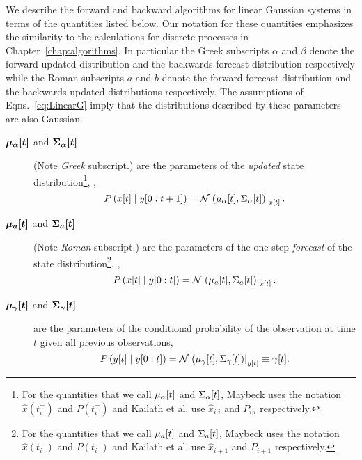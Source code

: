 We describe the forward and backward algorithms for linear Gaussian
systems in terms of the quantities listed below.  Our notation for
these quantities emphasizes the similarity to the calculations for
discrete processes in Chapter~\ref{chap:algorithms}.  In particular
the Greek subscripts $\alpha$ and $\beta$ denote the forward updated
distribution and the backwards forecast distribution respectively while
the Roman subscripts $a$ and $b$ denote the forward forecast
distribution and the backwards updated distributions respectively.
The assumptions of Eqns.~\eqref{eq:LinearG} imply that the
distributions described by these parameters are also Gaussian.
\begin{description}
\item[$\bm{{\mu_\alpha}{[t]}}$ and $\bm{{\Sigma_\alpha}{[t]}}$]
  (Note \emph{Greek} subscript.) are the parameters of the
  \emph{updated} state distribution\footnote{For the quantities that
    we call ${\mu_\alpha}{[t]}$ and ${\Sigma_\alpha}{[t]}$,
    Maybeck\cite{Maybeck82} uses the notation $\hat x(t^+_i)$ and
    $P(t^+_i)$ and Kailath et al.\cite{KSH00} use $\hat x_{i|i}$ and
    $P_{i|i}$ respectively.}, \ie,
  \begin{equation*}
    P\left({x}{[t]}\mid y[0:t+1] \right) =
    {\mathcal{N}}\left.\left({\mu_\alpha}{[t]},{\Sigma_\alpha}{[t]}\right)\right|_{{x}{[t]}}.
  \end{equation*}
\item[$\bm{{\mu_a}{[t]}}$ and $\bm{{\Sigma_a}{[t]}}$] (Note
  \emph{Roman} subscript.) are the parameters of the one step
  \emph{forecast} of the state distribution\footnote{For the
    quantities that we call ${\mu_a}{[t]}$ and ${\Sigma_a}{[t]}$,
    Maybeck\cite{Maybeck82} uses the notation $\hat x(t^-_i)$ and
    $P(t^-_i)$ and Kailath et al.\cite{KSH00} use $\hat x_{i+1}$ and
    $P_{i+1}$ respectively.}, \ie,
  \begin{equation*}
    P \left({x}{[t]}\mid y[0:t] \right) =
    {\mathcal{N}}\left.\left({\mu_a}{[t]},{\Sigma_a}{[t]}\right)\right|_{{x}{[t]}}.
  \end{equation*}
\item[$\bm{{\mu_\gamma}{[t]}}$ and $\bm{{\Sigma_\gamma}{[t]}}$] are
  the parameters of the conditional probability of the observation at
  time $t$ given all previous observations, \ie
  \begin{equation*}
    P\left({y}{[t]}\mid y[0:t] \right) =
    {\mathcal{N}}\left.\left({\mu_\gamma}{[t]},{\Sigma_\gamma}{[t]}\right)\right|_{{y}{[t]}}
    \equiv {\gamma}{[t]}.
  \end{equation*}

\end{description}
